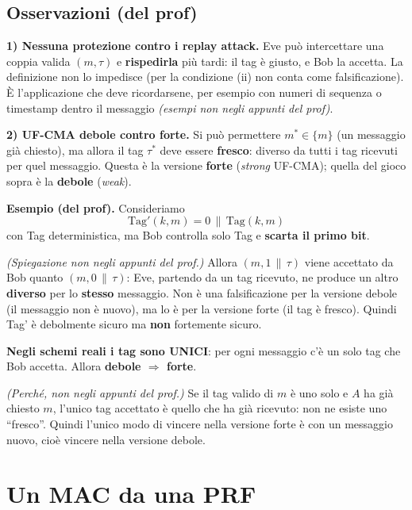 \subsection{Osservazioni (del prof)}

\textbf{1) Nessuna protezione contro i replay attack.} Eve può intercettare una coppia valida \((m, \tau)\) e \textbf{rispedirla} più tardi: il tag è giusto, e Bob la accetta. La definizione non lo impedisce (per la condizione (ii) non conta come falsificazione). È l'applicazione che deve ricordarsene, per esempio con numeri di sequenza o timestamp dentro il messaggio \emph{(esempi non negli appunti del prof)}.

\textbf{2) UF-CMA debole contro forte.} Si può permettere \(m^* \in \{m\}\) (un messaggio già chiesto), ma allora il tag \(\tau^*\) deve essere \textbf{fresco}: diverso da tutti i tag ricevuti per quel messaggio. Questa è la versione \textbf{forte} (\emph{strong} UF-CMA); quella del gioco sopra è la \textbf{debole} (\emph{weak}).

\begin{esempio}
\textbf{Esempio (del prof).} Consideriamo
\[
\text{Tag}'(k, m) = 0 \,\|\, \text{Tag}(k, m)
\]
con Tag deterministica, ma Bob controlla solo Tag e \textbf{scarta il primo bit}.

\emph{(Spiegazione non negli appunti del prof.)} Allora \((m, 1 \,\|\, \tau)\) viene accettato da Bob quanto \((m, 0 \,\|\, \tau)\): Eve, partendo da un tag ricevuto, ne produce un altro \textbf{diverso} per lo \textbf{stesso} messaggio. Non è una falsificazione per la versione debole (il messaggio non è nuovo), ma lo è per la versione forte (il tag è fresco). Quindi Tag' è debolmente sicuro ma \textbf{non} fortemente sicuro.
\end{esempio}

\textbf{Negli schemi reali i tag sono UNICI}: per ogni messaggio c'è un solo tag che Bob accetta. Allora \textbf{debole \(\Rightarrow\) forte}.

\emph{(Perché, non negli appunti del prof.)} Se il tag valido di \(m\) è uno solo e \(A\) ha già chiesto \(m\), l'unico tag accettato è quello che ha già ricevuto: non ne esiste uno ``fresco''. Quindi l'unico modo di vincere nella versione forte è con un messaggio nuovo, cioè vincere nella versione debole.

\section{Un MAC da una PRF}

